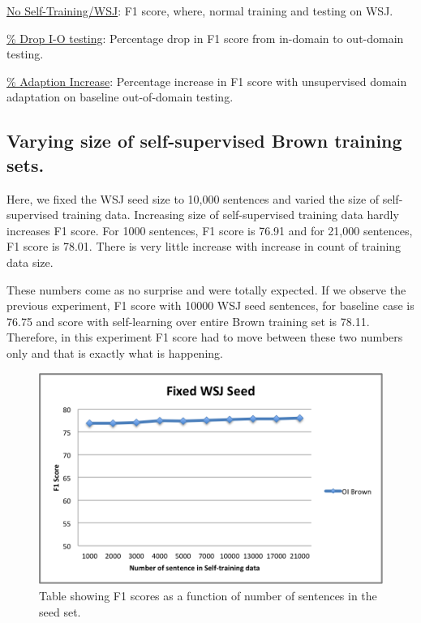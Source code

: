 \underline{No Self-Training/WSJ}: F1 score, where, normal training and testing on WSJ. 

\underline{\% Drop I-O testing}: Percentage drop in F1 score from in-domain to out-domain testing. 

\underline{\% Adaption Increase}: Percentage increase in F1 score with unsupervised domain adaptation on baseline out-of-domain testing.

\newpage

\subsection {Varying size of self-supervised Brown training sets.}

Here, we fixed the WSJ seed size to 10,000 sentences and varied the size of self-supervised training data. Increasing size of self-supervised training data hardly increases F1 score. For 1000 sentences, F1 score is 76.91 and for 21,000 sentences, F1 score is 78.01. There is very little increase with increase in count of training data size.

These numbers come as no surprise and were totally expected. If we observe the previous experiment, F1 score with 10000 WSJ seed sentences, for baseline case is 76.75 and score with self-learning over entire Brown training set is 78.11. Therefore, in this experiment F1 score had to move between these two numbers only and that is exactly what is happening.

\begin{figure}[ht!]
\centering
\includegraphics[width=140mm]{exp2.png}
\caption{Table showing F1 scores as a function of number of sentences in the seed set. }
\label{accuracy}
\end{figure}

